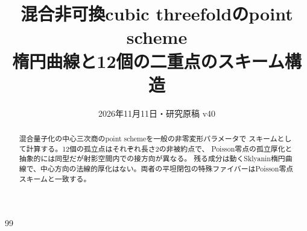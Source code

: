 
\title{混合非可換cubic threefoldのpoint scheme\\
\large 楕円曲線と12個の二重点のスキーム構造}
\author{}\date{2026年11月11日・研究原稿 v40}
\maketitle
\begin{abstract}
混合量子化の中心三次商のpoint schemeを一般の非零変形パラメータで
スキームとして計算する。12個の孤立点はそれぞれ長さ2の非被約点で、
Poisson零点の孤立厚化と抽象的には同型だが射影空間内での接方向が異なる。
残る成分は動くSklyanin楕円曲線で、中心方向の法線的厚化はない。両者の平坦閉包の特殊ファイバーはPoisson零点スキームと一致する。
\end{abstract}

\begin{thebibliography}{99}

\end{thebibliography}
